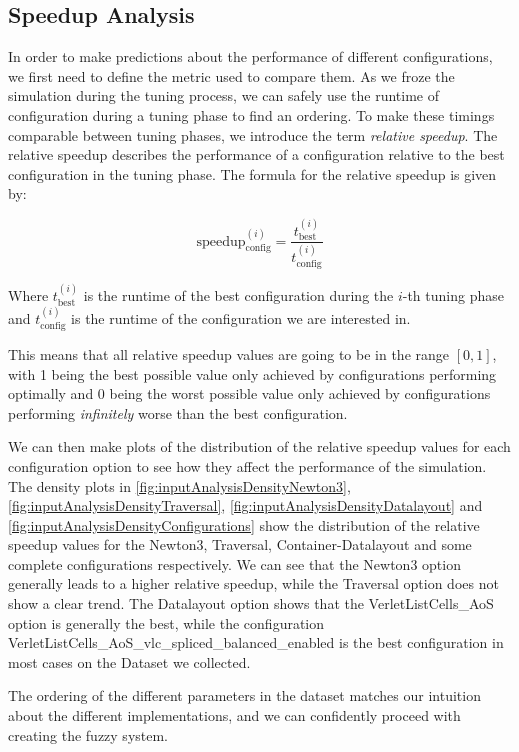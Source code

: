 \subsection{Speedup Analysis}

In order to make predictions about the performance of different configurations, we first need to define the metric used to compare them. As we froze the simulation during the tuning process, we can safely use the runtime of configuration during a tuning phase to find an ordering. To make these timings comparable between tuning phases, we introduce the term \emph{relative speedup}. The relative speedup describes the performance of a configuration relative to the best configuration in the tuning phase. The formula for the relative speedup is given by:

\begin{equation}
    {\text{speedup}^{(i)}_{\text{config}}}= \frac{t_{\text{best}}^{(i)}}{t_{\text{config}}^{(i)}}
\end{equation}

Where $t_{\text{best}}^{(i)}$ is the runtime of the best configuration during the $i$-th tuning phase and $t_{\text{config}}^{(i)}$ is the runtime of the configuration we are interested in.

This means that all relative speedup values are going to be in the range $[0,1]$, with 1 being the best possible value only achieved by configurations performing optimally and 0 being the worst possible value only achieved by configurations performing \emph{infinitely} worse than the best configuration.

We can then make plots of the distribution of the relative speedup values for each configuration option to see how they affect the performance of the simulation. The density plots in \autoref{fig:inputAnalysisDensityNewton3}, \autoref{fig:inputAnalysisDensityTraversal}, \autoref{fig:inputAnalysisDensityDatalayout} and \autoref{fig:inputAnalysisDensityConfigurations} show the distribution of the relative speedup values for the Newton3, Traversal, Container-Datalayout and some complete configurations respectively. We can see that the Newton3 option generally leads to a higher relative speedup, while the Traversal option does not show a clear trend. The Datalayout option shows that the VerletListCells\_AoS option is generally the best, while the configuration VerletListCells\_AoS\_vlc\_spliced\_balanced\_enabled is the best configuration in most cases on the Dataset we collected.

The ordering of the different parameters in the dataset matches our intuition about the different implementations, and we can confidently proceed with creating the fuzzy system.



